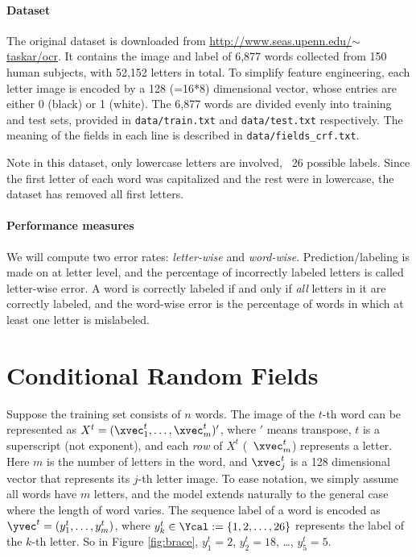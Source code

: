 \documentclass[11pt]{report}
\begin{document}
	
	
	\paragraph{Dataset}
	The original dataset is downloaded from \href{http://www.seas.upenn.edu/~taskar/ocr/}{http://www.seas.upenn.edu/$\sim$taskar/ocr}.
	It contains the image and label of 6,877 words collected from 150 human subjects,
	with 52,152 letters in total.
	To simplify feature engineering, each letter image is encoded by a 128 (=16*8) dimensional vector,
	whose entries are either 0 (black) or 1 (white).
	The 6,877 words are divided evenly into training and test sets,
	provided in \verb#data/train.txt# and \verb#data/test.txt# respectively.
	The meaning of the fields in each line is described in \verb#data/fields_crf.txt#.
	
	
	Note in this dataset, only lowercase letters are involved, \ie\ 26 possible labels.
	Since the first letter of each word was capitalized and the rest were in lowercase,
	the dataset has removed all first letters.
	
	
	\paragraph{Performance measures}
	We will compute two error rates: \emph{letter-wise} and \emph{word-wise}.
	Prediction/labeling is made on at letter level,
	and the percentage of incorrectly labeled letters is called letter-wise error.
	A word is correctly labeled if and only if \emph{all} letters in it are correctly labeled,
	and the word-wise error is the percentage of words in which at least one letter is mislabeled.
	
	
	\section{Conditional Random Fields}
	
	Suppose the training set consists of $n$ words.
	The image of the $t$-th word can be represented as
	$X^t = (\xvec^t_1, \ldots, \xvec^t_m)'$,
	where $'$ means transpose,
	$t$ is a superscript (not exponent),
	and each \emph{row} of $X^t$ (\eg\ $\xvec^t_m$) represents a letter.
	Here $m$ is the number of letters in the word,
	and $\xvec^t_j$ is a 128 dimensional vector that represents its $j$-th letter image.
	To ease notation, we simply assume all words have $m$ letters,
	and the model extends naturally to the general case where the length of word varies.
	The sequence label of a word is encoded as
	$\yvec^t = (y^t_1, \ldots, y^t_m)$,
	where $y^t_k \in \Ycal := \{1, 2, \ldots, 26\}$ represents the label of the $k$-th letter.
	So in Figure \ref{fig:brace}, $y^t_1 = 2$, $y^t_2 = 18$, \ldots, $y^t_5 = 5$.
	
\end{document}
